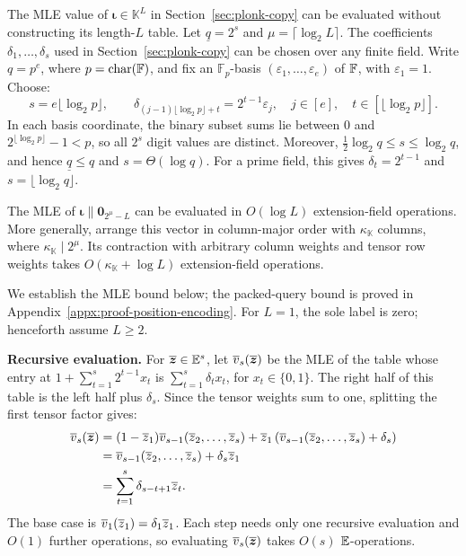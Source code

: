 The MLE value of $\bm{\iota} \in \mathbb{K}^L$ in Section~\ref{sec:plonk-copy} can be
evaluated without constructing its length-\(L\) table.
Let \(\underline q=2^s\) and \(\mu=\lceil\log_2L\rceil\).
The coefficients \(\delta_1,\ldots,\delta_s\) used in
Section~\ref{sec:plonk-copy} can be chosen over any finite field.
Write \(q=p^e\), where \(p=\operatorname{char}({\mathbb{F}})\), and
fix an \(\mathbb F_p\)-basis
\((\varepsilon_1,\ldots,\varepsilon_e)\) of \({\mathbb{F}}\),
with \(\varepsilon_1=1\). Choose:
\[
    s=e\lfloor\log_2p\rfloor,
    \qquad
    \delta_{(j-1)\lfloor\log_2p\rfloor+t}
       =2^{t-1}\varepsilon_j,
    \quad
    j\in[e],\quad t\in[\lfloor\log_2p\rfloor].
\]
In each basis coordinate, the binary subset sums lie between
\(0\) and \(2^{\lfloor\log_2p\rfloor}-1<p\), so all
\(2^s\) digit values are distinct. Moreover,
\(\tfrac12\log_2q\leq s\leq\log_2q\), and hence
\(\underline q\leq q\) and \(s=\Theta(\log q)\).
For a prime field, this gives \(\delta_t=2^{t-1}\) and
\(s=\lfloor\log_2q\rfloor\).

\begin{proposition}
\label{proposition:position-encoding-evaluation}
The MLE of \(\bm\iota\mathbin{\|}\bm0_{2^\mu-L}\)
can be evaluated in \(O(\log L)\) extension-field operations.
More generally, arrange this vector in column-major order
with \(\kappa_{\mathbb K}\) columns, where
\(\kappa_{\mathbb K}\mid2^\mu\).
Its contraction with arbitrary column weights and tensor row
weights takes \(O(\kappa_{\mathbb K}+\log L)\)
extension-field operations.
\end{proposition}
We establish the MLE bound below; the packed-query bound is
proved in Appendix~\ref{appx:proof-position-encoding}.
For \(L=1\), the sole label is zero; henceforth assume \(L\geq2\).

\smallskip\noindent\textbf{Recursive evaluation.}
For \(\overline{\bm{z}}\in\mathbb{E}^s\), let
\(\overline{v}_s(\overline{\bm{z}})\) be the MLE of the table whose
entry at \(1+\sum_{t=1}^s2^{t-1}x_t\) is
\(\sum_{t=1}^s\delta_tx_t\), for \(x_t\in\{0,1\}\).
The right half of this table is the left half plus \(\delta_s\).
Since the tensor weights sum to one, splitting the first
tensor factor gives:
\begin{equation}
\begin{aligned}
    \overline{v}_s(\overline{\bm{z}})
       &=(1-\overline{z}_1)
          \overline{v}_{s-1}(\overline{z}_2,\ldots,\overline{z}_s)
          +\overline{z}_1\left(
          \overline{v}_{s-1}(\overline{z}_2,\ldots,\overline{z}_s)
          +\delta_s\right)\\
       &=\overline{v}_{s-1}(\overline{z}_2,\ldots,\overline{z}_s)
          +\delta_s\overline{z}_1\\
       &=\sum_{t=1}^s\delta_{s-t+1}\overline{z}_t.
\end{aligned}
\label{eq:iota-digit-recursion}
\end{equation}
The base case is \(\overline{v}_1(\overline{z}_1)=\delta_1\overline{z}_1\).
Each step needs only one recursive evaluation and
\(O(1)\) further operations, so evaluating
\(\overline{v}_s(\overline{\bm{z}})\) takes \(O(s)\)
$\mathbb{E}$-operations.

